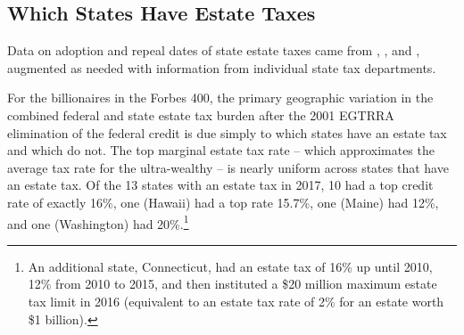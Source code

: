\documentclass[12pt]{article}
\begin{document}
\subsection{Which States Have  Estate Taxes}

Data on adoption and repeal dates of state estate taxes came from \cite{michael2018survey}, \cite{walczak2017state}, \cite{conway2004diagnosis} and \cite{bakija/slemrod:2004}, augmented as needed with information from individual state tax departments. 

For the billionaires in the Forbes 400, the primary geographic variation in the combined federal and state estate tax burden after the 2001 EGTRRA elimination of the federal credit is due simply to which states have an estate tax and which do not. The top marginal estate tax rate -- which approximates the average tax rate for the ultra-wealthy -- is nearly uniform across states that have an estate tax. Of the 13 states with an estate tax in 2017, 10 had a top credit rate of exactly 16\%, one (Hawaii) had a top rate 15.7\%, one (Maine) had 12\%, and one (Washington) had 20\%.\footnote{An additional state, Connecticut, had an estate tax of 16\% up until 2010, 12\% from 2010 to 2015, and then instituted a \$20 million maximum estate tax limit in 2016 (equivalent to an estate tax rate of 2\% for an estate worth \$1 billion).} 
\end{document}
